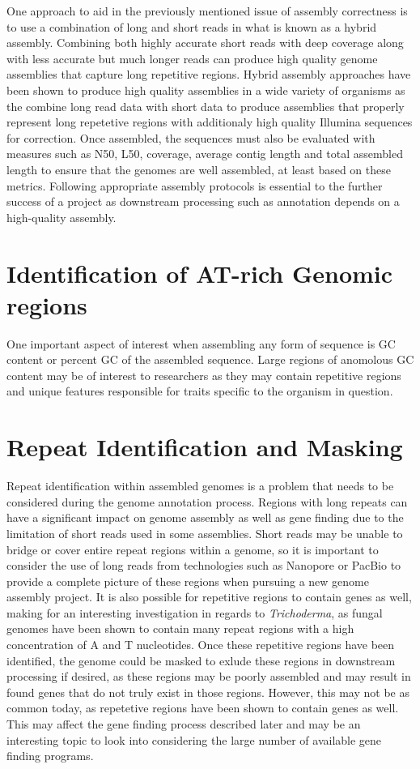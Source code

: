 One approach to aid in the previously mentioned issue of assembly
correctness is to use a combination of long and short reads in what is
known as a hybrid assembly. Combining both highly accurate short reads
with deep coverage along with less accurate but much longer reads can
produce high quality genome assemblies that capture long repetitive
regions. Hybrid assembly approaches have been shown to produce high
quality assemblies in a wide variety of organisms as the combine long
read data with short data to produce assemblies that properly
represent long repetetive regions with additionaly high quality
Illumina sequences for correction. Once assembled, the sequences must
also be evaluated with measures such as N50, L50, coverage, average
contig length and total assembled length to ensure that the genomes
are well assembled, at least based on these
metrics\cite{Nagarajan2013}. Following appropriate assembly protocols
is essential to the further success of a project as downstream
processing such as annotation depends on a high-quality assembly.

\section{Identification of AT-rich Genomic regions}
One important aspect of interest when assembling any form of sequence
is GC content or percent GC of the assembled sequence. Large regions
of anomolous GC content may be of interest to researchers as they may
contain repetitive regions and unique features responsible for traits
specific to the organism in question.

\section{Repeat Identification and Masking}
Repeat identification within assembled genomes is a problem that needs
to be considered during the genome annotation process. Regions with
long repeats can have a significant impact on genome assembly as well
as gene finding due to the limitation of short reads used in some
assemblies\cite{Treangen2011}. Short reads may be unable to bridge or
cover entire repeat regions within a genome, so it is important to
consider the use of long reads from technologies such as Nanopore or
PacBio to provide a complete picture of these regions when pursuing a
new genome assembly project. It is also possible for repetitive
regions to contain genes as well, making for an interesting
investigation in regards to \textit{Trichoderma}, as fungal genomes
have been shown to contain many repeat regions with a high
concentration of A and T
nucleotides\cite{10.1371/journal.pgen.1007467}. Once these repetitive
regions have been identified, the genome could be masked to exlude
these regions in downstream processing if desired, as these regions
may be poorly assembled and may result in found genes that do not
truly exist in those regions. However, this may not be as common
today, as repetetive regions have been shown to contain genes as
well\cite{Slotkin2018}. This may affect the gene finding process
described later and may be an interesting topic to look into
considering the large number of available gene finding programs.



